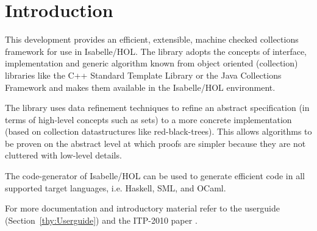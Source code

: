 \chapter{Introduction}
  This development provides an efficient, extensible, machine checked collections framework for use
  in Isabelle/HOL. The library adopts the concepts of interface, implementation and generic algorithm
  known from object oriented (collection) libraries like the C++ Standard Template Library\cite{C++STL} or 
  the Java Collections Framework\cite{JavaCollFr} and makes them available in the Isabelle/HOL environment.

  The library uses data refinement techniques to refine an abstract specification (in terms of high-level concepts such as sets) to a more concrete implementation (based on collection datastructures like red-black-trees).
  This allows algorithms to be proven on the abstract level at which proofs are simpler because they are not cluttered with low-level details.

  The code-generator of Isabelle/HOL can be used to generate efficient code in all supported target languages, i.e. Haskell, SML, and OCaml.

  For more documentation and introductory material refer to the userguide (Section~\ref{thy:Userguide}) and the ITP-2010 paper \cite{LammichLochbihler2010ITP}.
